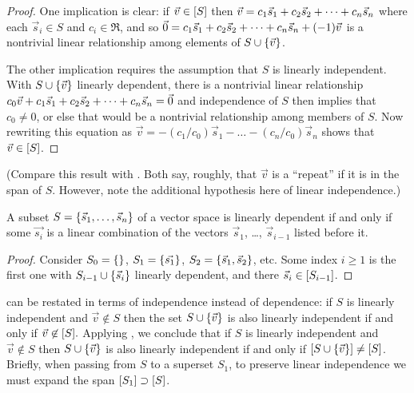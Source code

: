 \begin{proof}
One implication is clear: if \( \vec{v}\in\relax [S\relax ] \) then
\( \vec{v}=c_1\vec{s}_1+c_2\vec{s}_2+\cdots +c_n\vec{s}_n \) where each \( \vec{s}_i\in S \) and
\( c_i\in\Re \), and so \( \vec{0}=c_1\vec{s}_1+c_2\vec{s}_2+\cdots +c_n\vec{s}_n+(-1)\vec{v} \)
is a nontrivial linear relationship among elements of
\( S\cup\mbox{$\{\vec{v}\}$} \).

The other implication requires the assumption that \( S \) is linearly
independent.
With \( S\cup\mbox{$\{\vec{v}\}$} \) linearly dependent, there is a
nontrivial linear relationship \( c_0\vec{v}+c_1\vec{s}_1+c_2\vec{s}_2+\cdots +c_n\vec{s}_n=\vec{0} \)
and independence of $S$ then implies that \( c_0\neq 0 \), 
or else that would be a nontrivial
relationship among members of \( S \).
Now rewriting this equation as
\( \vec{v}=-(c_1/c_0)\vec{s}_1-\dots-(c_n/c_0)\vec{s}_n \) shows
that \( \vec{v}\in\relax [S\relax ] \).
\end{proof}

\noindent
(Compare this result with .
Both say, roughly, that $\vec{v}$ is a ``repeat'' if it is in the
span of $S$.
However, note the additional hypothesis here of linear independence.)

\begin{corollary}
\label{cor:LDMeansLC}
A subset \( S=\mbox{$\{\vec{s}_1,\dots,\vec{s}_n\}$} \) of a vector space
is linearly dependent if and only if some \( \vec{s_i} \)
is a linear combination of the vectors 
\( \vec{s}_1 \), \ldots, \( \vec{s}_{i-1} \)
listed before it.
\end{corollary}

\begin{proof}
Consider \( S_0=\mbox{$\{\}$} \), \( S_1=\mbox{$\{\vec{s_1}\}$} \),
\( S_2=\mbox{$\{\vec{s}_1,\vec{s}_2 \}$} \), etc.
Some index \( i\geq 1 \) is the first one with
\( S_{i-1}\cup\mbox{$\{\vec{s}_i \}$} \)
linearly dependent, and there \( \vec{s}_i\in\relax [ S_{i-1} \relax ] \).
\end{proof}

 can be restated
in terms of independence instead of dependence:
if \( S \) is linearly independent and \( \vec{v}\not\in S \) then
the set \( S\cup\mbox{$\{\vec{v}\}$} \)
is also linearly independent if and only if \( \vec{v}\not\in\relax [S\relax ]. \)
Applying ,
we conclude that
if \( S \) is linearly independent and \( \vec{v}\not\in S \)
then \( S\cup\mbox{$\{\vec{v}\}$} \) is also
linearly independent if and only if
\( \relax [S\cup\mbox{$\{\vec{v}\}$}\relax ]\neq\relax [S\relax ] \).
Briefly,
when passing from $S$ to a superset $S_1$,
to preserve linear independence we must expand the span
$\relax [S_1\relax ]\supset\relax [S\relax ]$.

